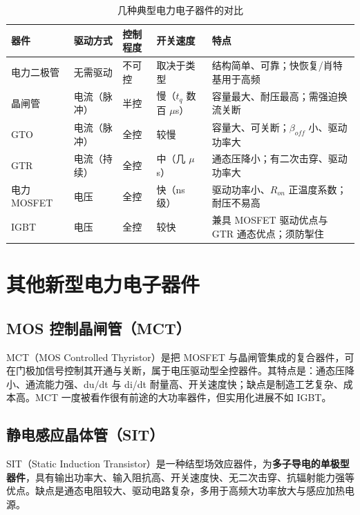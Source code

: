 \begin{table}[htbp]
\centering
\caption{几种典型电力电子器件的对比}
\label{tab:2-4}
\begin{tabular}{p{2.5cm}p{2.5cm}p{2.4cm}p{2.4cm}p{3.6cm}}
\toprule
\textbf{器件} & \textbf{驱动方式} & \textbf{控制程度} & \textbf{开关速度} & \textbf{特点} \\
\midrule
电力二极管 & 无需驱动 & 不可控 & 取决于类型 & 结构简单、可靠；快恢复/肖特基用于高频 \\
晶闸管 & 电流（脉冲） & 半控 & 慢（$t_q$ 数百 $\mu$s） & 容量最大、耐压最高；需强迫换流关断 \\
GTO & 电流（脉冲） & 全控 & 较慢 & 容量大、可关断；$\beta_{off}$ 小、驱动功率大 \\
GTR & 电流（持续） & 全控 & 中（几 $\mu$s） & 通态压降小；有二次击穿、驱动功率大 \\
电力 MOSFET & 电压 & 全控 & 快（ns 级） & 驱动功率小、$R_{on}$ 正温度系数；耐压不易高 \\
IGBT & 电压 & 全控 & 较快 & 兼具 MOSFET 驱动优点与 GTR 通态优点；须防掣住 \\
\bottomrule
\end{tabular}
\end{table}

\section{其他新型电力电子器件}

\subsection{MOS 控制晶闸管（MCT）}

MCT（MOS Controlled Thyristor）是把 MOSFET 与晶闸管集成的复合器件，可在门极加信号控制其开通与关断，属于电压驱动型全控器件。其特点是：通态压降小、通流能力强、du/dt 与 di/dt 耐量高、开关速度快；缺点是制造工艺复杂、成本高。MCT 一度被看作很有前途的大功率器件，但实用化进展不如 IGBT。

\subsection{静电感应晶体管（SIT）}

SIT（Static Induction Transistor）是一种结型场效应器件，为\textbf{多子导电的单极型器件}，具有输出功率大、输入阻抗高、开关速度快、无二次击穿、抗辐射能力强等优点。缺点是通态电阻较大、驱动电路复杂，多用于高频大功率放大与感应加热电源。

